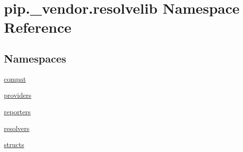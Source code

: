 \hypertarget{namespacepip_1_1__vendor_1_1resolvelib}{}\section{pip.\+\_\+vendor.\+resolvelib Namespace Reference}
\label{namespacepip_1_1__vendor_1_1resolvelib}
\subsection*{Namespaces}
\begin{DoxyCompactItemize}
\item 
 \hyperlink{namespacepip_1_1__vendor_1_1resolvelib_1_1compat}{compat}
\item 
 \hyperlink{namespacepip_1_1__vendor_1_1resolvelib_1_1providers}{providers}
\item 
 \hyperlink{namespacepip_1_1__vendor_1_1resolvelib_1_1reporters}{reporters}
\item 
 \hyperlink{namespacepip_1_1__vendor_1_1resolvelib_1_1resolvers}{resolvers}
\item 
 \hyperlink{namespacepip_1_1__vendor_1_1resolvelib_1_1structs}{structs}
\end{DoxyCompactItemize}
